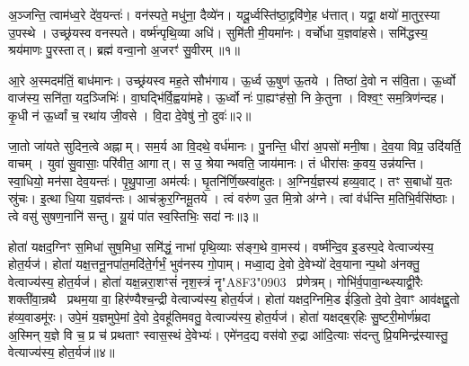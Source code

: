 \clearpage
{}
\setcounter{anuvakam}{0}

अ॒ञ्जन्ति॒ त्वाम॑ध्व॒रे दे॑व॒यन्तः॑।
वन॑स्पते॒ मधु॑ना॒ दैव्ये॑न।
यदू॒र्ध्वस्ति॑ष्ठा॒द्द्रवि॑णे॒ह ध॑त्तात्।
यद्वा॒ क्षयो॑ मा॒तुर॒स्या उ॒पस्थे।
उच्छ्र॑यस्व वनस्पते।
वर्ष्म॑न्पृथि॒व्या अधि॑।
सुमि॑ती मी॒यमा॑नः।
वर्चो॑धा य॒ज्ञवा॑हसे।
समि॑द्धस्य॒ श्रय॑माणः पु॒रस्तात्।
ब्रह्म॑ वन्वा॒नो अ॒जरꣳ॑ सु॒वीरम्॥१॥

आ॒रे अ॒स्मदम॑तिं॒ बाध॑मानः।
उच्छ्र॑यस्व मह॒ते सौभ॑गाय।
ऊ॒र्ध्व ऊ॒षुण॑ ऊ॒तये।
तिष्ठा॑ दे॒वो न स॑वि॒ता।
ऊ॒र्ध्वो वाज॑स्य॒ सनि॑ता॒ यद॒ञ्जिभिः॑।
वा॒घद्भि॑र्वि॒ह्वया॑महे।
ऊ॒र्ध्वो नः॑ पा॒ह्यꣳह॑सो॒ नि के॒तुना।
विश्व॒ꣳ॒ सम॒त्रिण॑न्दह।
कृ॒धी न॑ ऊ॒र्ध्वां च॒ रथा॑य जी॒वसे।
वि॒दा दे॒वेषु॑ नो॒ दुवः॑॥२॥

जा॒तो जा॑यते सुदिन॒त्वे अह्नाम्।
सम॒र्य आ वि॒दथे॒ वर्ध॑मानः।
पु॒नन्ति॒ धीरा॑ अ॒पसो॑ मनी॒षा।
दे॒व॒या विप्र॒ उदि॑यर्ति॒ वाचम्।
युवा॑ सु॒वासाः॒ परि॑वीत॒ आगात्।
स उ॒ श्रेयान्भवति॒ जाय॑मानः।
तं धीरा॑सः क॒वय॒ उन्न॑यन्ति।
स्वा॒धियो॒ मन॑सा देव॒यन्तः॑।
पृ॒थु॒पाजा॒ अम॑र्त्यः।
घृ॒तनि॑र्णि॒ख्स्वा॑हुतः।
अ॒ग्निर्य॒ज्ञस्य॑ हव्य॒वाट्।
तꣳ स॒बाधो॑ य॒तः स्रु॑चः।
इ॒त्था धि॒या य॒ज्ञव॑न्तः।
आच॑क्रुर॒ग्निमू॒तये।
त्वं वरु॑ण उ॒त मि॒त्रो अ॑ग्ने।
त्वां व॑र्धन्ति म॒तिभि॒र्वसि॑ष्ठाः।
त्वे वसु॑ सुषण॒नानि॑ सन्तु।
यू॒यं पा॑त स्व॒स्तिभिः॒ सदा॑ नः॥३॥\anuvakamend[सु॒वीर॒न्दुवः॒ स्वा॑हुतो॒\-ऽष्टौ च॑]

होता॑ यक्षद॒ग्निꣳ स॒मिधा॑ सुष॒मिधा॒ समि॑द्धं॒ नाभा॑ पृथि॒व्याः स॑ङ्ग॒थे वा॒मस्य॑।
वर्ष्म॑न्दि॒व इ॒डस्प॒दे वेत्वाज्य॑स्य॒ होत॒र्यज॑।
होता॑ यक्ष॒त्तनू॒नपा॑त॒मदि॑ते॒र्गर्भं॒ भुव॑नस्य गो॒पाम्।
मध्वा॒द्य दे॒वो दे॒वेभ्यो॑ देव॒यानान्प॒थो अ॑नक्तु॒ वेत्वाज्य॑स्य॒ होत॒र्यज॑।
होता॑ यक्ष॒न्नरा॒शꣳसं॑ नृश॒स्त्रं नॄ\char"A8F3\char"0903~ प्र॑णेत्रम्।
गोभि॑र्व॒पावा॒न्थ्स्याद्वी॒रैः शक्ती॑वा॒न्रथै प्रथम॒या वा॒ हिर॑ण्यैश्च॒न्द्री वेत्वाज्य॑स्य॒ होत॒र्यज॑।
होता॑ यक्षद॒ग्निमि॒ड ई॑डि॒तो दे॒वो दे॒वाꣳ आव॑क्षद्दू॒तो ह॑व्य॒वाडमू॑रः।
उपे॒मं य॒ज्ञमुपे॒मां दे॒वो दे॒वहू॑तिमवतु॒ वेत्वाज्य॑स्य॒ होत॒र्यज॑।
होता॑ यक्षद्ब॒र्‌\mbox{}हिः सु॒ष्टरी॒मोर्ण॑म्रदा अ॒स्मिन् य॒ज्ञे वि च॒ प्र च॑ प्रथताꣳ स्वास॒स्थं दे॒वेभ्यः॑।
एमे॑नद॒द्य वस॑वो रु॒द्रा आ॑दि॒त्याः स॑दन्तु प्रि॒यमिन्द्र॑स्यास्तु॒ वेत्याज्य॑स्य॒ होत॒र्यज॑॥४॥

